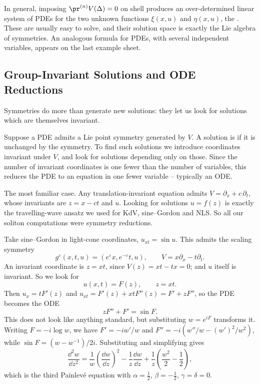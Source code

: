 In general, imposing $\pr^{(n)}V(\Delta) = 0$ on shell produces an over-determined linear system of PDEs for the two unknown functions $\xi(x,u)$ and $\eta(x,u)$, the . These are usually easy to solve, and their solution space is exactly the Lie algebra of symmetries. An analogous formula for PDEs, with several independent variables, appears on the last example sheet.

\subsection{Group-Invariant Solutions and ODE Reductions}

Symmetries do more than generate new solutions: they let us look for solutions which are themselves invariant.

Suppose a PDE admits a Lie point symmetry generated by $V$. A solution is  if it is unchanged by the symmetry. To find such solutions we introduce coordinates invariant under $V$, and look for solutions depending only on those. Since the number of invariant coordinates is one fewer than the number of variables, this reduces the PDE to an equation in one fewer variable -- typically an ODE.

\begin{example}
	The most familiar case. Any translation-invariant equation admits $V = \partial_x + c\,\partial_t$, whose invariants are $z = x - ct$ and $u$. Looking for solutions $u = f(z)$ is exactly the travelling-wave ansatz we used for KdV, sine--Gordon and NLS. So all our soliton computations were symmetry reductions.
\end{example}

\begin{example}
	Take sine--Gordon in light-cone coordinates, $u_{xt} = \sin u$. This admits the scaling symmetry
	$$
	g^\varepsilon(x,t,u) = \left(e^\varepsilon x, e^{-\varepsilon}t, u\right), \qquad V = x\partial_x - t\partial_t.
	$$
	An invariant coordinate is $z = xt$, since $V(z) = xt - tx = 0$; and $u$ itself is invariant. So we look for
	$$
	u(x,t) = F(z), \qquad z = xt.
	$$
	Then $u_x = tF'(z)$ and $u_{xt} = F'(z) + xtF''(z) = F' + zF''$, so the PDE becomes the ODE
	$$
	zF'' + F' = \sin F.
	$$
	This does not look like anything standard, but substituting $w = e^{iF}$ transforms it. Writing $F = -i\log w$, we have $F' = -iw'/w$ and $F'' = -i(w''/w - (w')^2/w^2)$, while $\sin F = (w - w^{-1})/2i$. Substituting and simplifying gives
	$$
	\frac{\dd^2w}{\dd z^2} = \frac{1}{w}\left(\frac{\dd w}{\dd z}\right)^2 - \frac1z\frac{\dd w}{\dd z} + \frac{1}{z}\left(\frac{w^2}{2} - \frac12\right),
	$$
	which is the third Painlev\'e equation with $\alpha = \frac12$, $\beta = -\frac12$, $\gamma = \delta = 0$.
\end{example}

